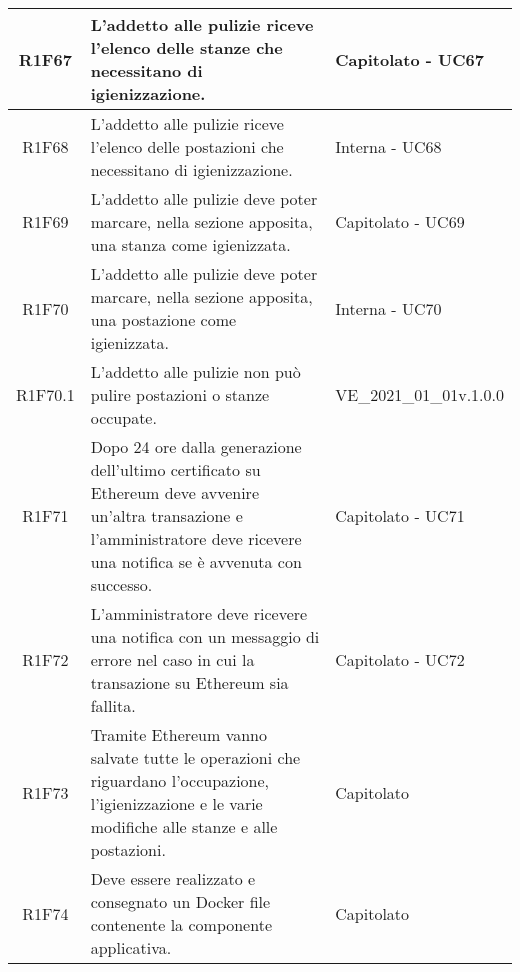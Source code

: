 \begin{center}
\begin{longtable}{|c|p{10cm}|p{4cm}|}
		R1F67&L'addetto alle pulizie riceve l'elenco delle stanze che necessitano di igienizzazione.& 	Capitolato - UC67\\
		\hline
		R1F68&L'addetto alle pulizie riceve l'elenco delle postazioni che necessitano di igienizzazione.	& Interna - UC68	\\
		\hline
		R1F69&L'addetto alle pulizie deve poter marcare, nella sezione apposita, una stanza come igienizzata.	& Capitolato - UC69	\\
		\hline
		R1F70&L'addetto alle pulizie deve poter marcare, nella sezione apposita, una postazione come igienizzata.	&Interna - UC70 	\\
		\hline
		R1F70.1&L'addetto alle pulizie non può pulire postazioni o stanze occupate.	& VE\_2021\_01\_01v.1.0.0	\\
		\hline
		R1F71&Dopo 24 ore dalla generazione dell'ultimo certificato su Ethereum deve avvenire un'altra transazione e l'amministratore deve ricevere una notifica se è avvenuta con successo.	& Capitolato - UC71	\\
		\hline
		R1F72&L'amministratore deve ricevere una notifica con un messaggio di errore nel caso in cui la transazione su Ethereum sia fallita.	& Capitolato - UC72	\\
		\hline
		R1F73&Tramite Ethereum vanno salvate tutte le operazioni che riguardano l'occupazione, l'igienizzazione e le varie modifiche alle stanze e alle postazioni.	& Capitolato	\\
		\hline
		R1F74 &Deve essere realizzato e consegnato un Docker file contenente la componente applicativa. & Capitolato\\
		\hline
		
	\end{longtable}
\end{center}


